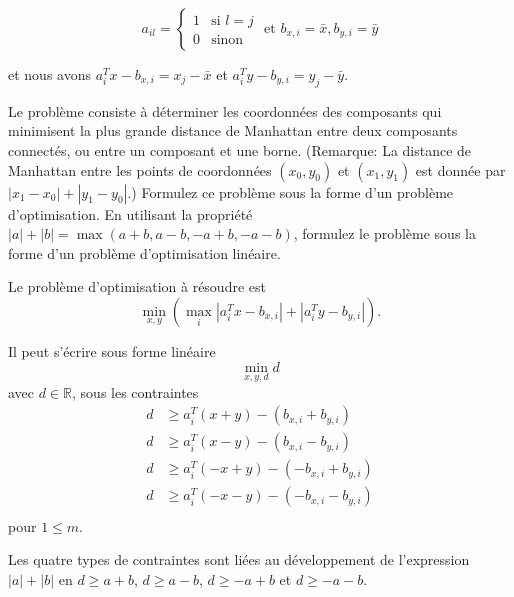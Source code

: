 \begin{enumerate}
\begin{itemize}
        $$a_{il}=
        \left\{
          \begin{array}{rll}
            1 & \mbox{si } l=j\\
            0 & \mbox{sinon}
          \end{array}
        \right.
        \mbox{ et }
        b_{x, i}=\bar x, b_{y,i}=\bar y
        $$

        et nous avons $a_i^Tx-b_{x,i}=x_j-\bar x$ et $a_i^Ty-b_{y,i}=y_j-\bar y.$

    \end{itemize}

    Le problème consiste à déterminer les coordonnées des composants qui minimisent
    la plus grande distance de Manhattan
    entre deux composants connectés, ou entre un composant et une borne. (Remarque: La distance de Manhattan entre les
    points de coordonnées
    $(x_0, y_0)$ et
    $(x_1, y_1)$ est donnée par
    $|x_1-x_0|+|y_1-y_0|$.) Formulez ce problème sous la forme d'un problème
    d'optimisation. En utilisant la propriété
    $|a|+|b|=\max(a+b, a-b, -a+b, -a-b)$, formulez le problème sous la
    forme d'un problème d'optimisation linéaire.

    \begin{solution}
      Le problème d'optimisation à résoudre est
      \[\min_{x, y} \left( \max_{i} |a_i^Tx - b_{x,i}| + |a_i^Ty - b_{y,i}|\right).\]

      Il peut s'écrire sous forme linéaire
      \[\min_{x, y, d} d\]
      avec $d\in\mathbb{R}$, sous les contraintes
      \begin{align*}
      d &\geq a_i^T \left(x+y\right) - \left(b_{x,i} + b_{y, i}\right) \\
      d &\geq a_i^T \left(x-y\right) - \left(b_{x,i} - b_{y, i}\right) \\
      d &\geq a_i^T \left(-x+y\right) - \left(-b_{x,i} + b_{y, i}\right) \\
      d &\geq a_i^T \left(-x-y\right) - \left(-b_{x,i} - b_{y, i}\right) \\
      \end{align*}
      pour $1\leq m$.

     Les quatre types de contraintes sont liées au développement de l'expression
     $|a|+|b|$ en $d\geq a+b$, $d\geq a-b$, $d\geq -a+b$ et $d\geq -a-b$.
    \end{solution}

\end{enumerate}
